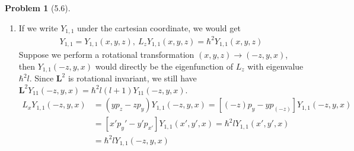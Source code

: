 \documentclass[twoside,11pt]{article}
\theoremstyle{definition}
\newtheorem{problem}{Problem}
\theoremstyle{remark}
\begin{document}
\begin{problem}[5.6]\
    \begin{enumerate}[label=(\alph*)]
        \item If we write $Y_{1,1}$ under the cartesian coordinate, we would get
        \begin{align*}
            Y_{1,1} = Y_{1,1}(x,y,z),\
            L_z Y_{1, 1}(x, y, z) = \hbar^2 Y_{1, 1}(x, y, z)
        \end{align*}
        Suppose we perform a rotational transformation $(x, y, z)\rightarrow(-z, y, x)$, 
        then $Y_{1, 1}(-z, y, x)$ would directly be the eigenfunction of $L_z$ with eigenvalue
        $\hbar^2l$.
        Since $\mathbf{L}^2$ is rotational invariant, we still have $\mathbf{L}^2Y_{11}(-z, y, x) =\hbar^2l(l+1)
        Y_{11}(-z, y, x)$.
        \begin{align*}
            L_xY_{1, 1}(-z, y, x) 
            &= (yp_z - zp_y) Y_{1,1}(-z, y, x)
            = [(-z)p_y - yp_{(-z)}] Y_{1,1}(-z,y,x)\\
            &= [x'p_y'  - y' p_{x'}] Y_{1,1}(x',y',x)
            = \hbar^2l Y_{1,1}(x', y', x)\\
            &= \hbar^2 l Y_{1,1}(-z, y, x)
        \end{align*}
        

\end{enumerate}
\end{problem}
\end{document}
